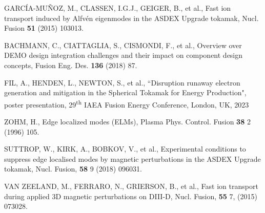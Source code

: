 \documentclass[10pt, a4paper, twoside]{article}
\begin{document}
\begin{thebibliography}{9}
    GARC\'IA-MU\~NOZ, M., CLASSEN, I.G.J., GEIGER, B., et al., 
    Fast ion transport induced by Alfv\'en eigenmodes in the ASDEX Upgrade tokamak, 
    Nucl. Fusion 
    \textbf{51} 
    (2015) 
    103013.

    BACHMANN, C., CIATTAGLIA, S., CISMONDI, F., et al., 
    Overview over DEMO design integration challenges and their impact on component design concepts, 
    Fusion Eng. Des. 
    \textbf{136} 
    (2018)
    87.

    FIL, A., HENDEN, L., NEWTON, S., et al.,
    ``Disruption runaway electron generation and mitigation in the Spherical Tokamak for Energy Production",
    poster presentation, 
    29\textsuperscript{th} IAEA Fusion Energy Conference,
    London, UK, 
    2023

    ZOHM, H., 
    Edge localized modes (ELMs), 
    Plasma Phys. Control. Fusion 
    \textbf{38} 2 
    (1996) 
    105.


    SUTTROP, W., KIRK, A., BOBKOV, V., et al.,
    Experimental conditions to suppress edge localised modes by magnetic perturbations in the ASDEX Upgrade tokamak,
    Nucl. Fusion,
    \textbf{58} 9 
    (2018) 
    096031.
    
    VAN ZEELAND, M., FERRARO, N., GRIERSON, B., et al.,
    Fast ion transport during applied 3D magnetic perturbations on DIII-D,
    Nucl. Fusion,
    \textbf{55} 7,
    (2015)
    073028.


\end{thebibliography}
\end{document}

